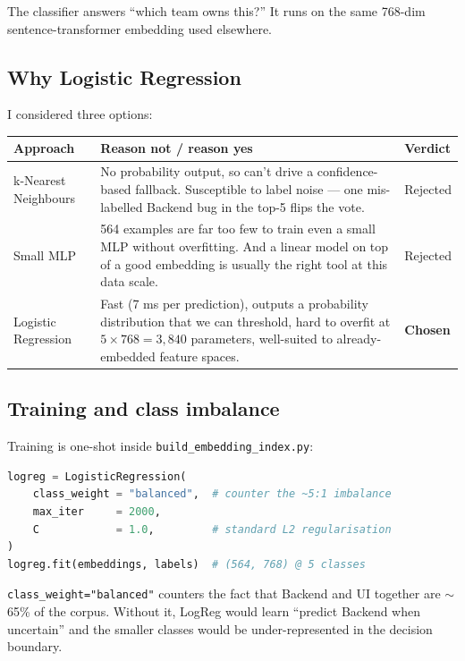 \documentclass[11pt,a4paper]{article}
\begin{document}
The classifier answers ``which team owns this?'' It runs on the same 768-dim
sentence-transformer embedding used elsewhere.

\subsection{Why Logistic Regression}

I considered three options:

\begin{table}[h]
\centering
\small
\begin{tabularx}{\linewidth}{lXl}
\toprule
\textbf{Approach} & \textbf{Reason not / reason yes} & \textbf{Verdict} \\
\midrule
k-Nearest Neighbours & No probability output, so can't drive a confidence-based fallback. Susceptible to label noise --- one mis-labelled Backend bug in the top-5 flips the vote. & Rejected \\
\addlinespace
Small MLP           & 564 examples are far too few to train even a small MLP without overfitting. And a linear model on top of a good embedding is usually the right tool at this data scale. & Rejected \\
\addlinespace
Logistic Regression & Fast (7 ms per prediction), outputs a probability distribution that we can threshold, hard to overfit at $5\times 768=3{,}840$ parameters, well-suited to already-embedded feature spaces. & \textbf{Chosen} \\
\bottomrule
\end{tabularx}
\end{table}

\subsection{Training and class imbalance}

Training is one-shot inside \texttt{build\_embedding\_index.py}:

\begin{lstlisting}[language=python]
logreg = LogisticRegression(
    class_weight = "balanced",  # counter the ~5:1 imbalance
    max_iter     = 2000,
    C            = 1.0,         # standard L2 regularisation
)
logreg.fit(embeddings, labels)  # (564, 768) @ 5 classes
\end{lstlisting}

\texttt{class\_weight="balanced"} counters the fact that Backend and UI
together are $\sim$65\% of the corpus. Without it, LogReg would learn
``predict Backend when uncertain'' and the smaller classes would be
under-represented in the decision boundary.
\end{document}
